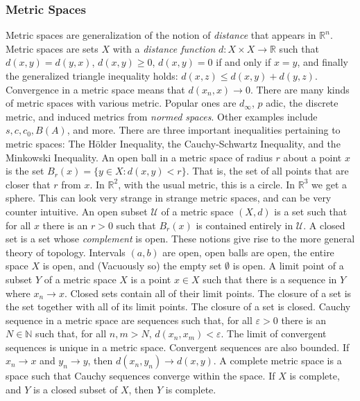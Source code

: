 \documentclass[crop=false,class=article,oneside]{standalone}
\begin{document}
        \subsubsection{Metric Spaces}
            Metric spaces are generalization of the notion
            of \textit{distance} that appears in $\mathbb{R}^{n}$.
            Metric spaces are sets $X$ with a
            \textit{distance function}
            $d:X\times{X}\rightarrow\mathbb{R}$ such that
            $d(x,y)=d(y,x)$, $d(x,y)\geq{0}$,
            $d(x,y)=0$ if and only if $x=y$, and finally the
            generalized triangle inequality holds:
            $d(x,z)\leq{d(x,y)+d(y,z)}$. Convergence in a metric
            space means that $d(x_{n},x)\rightarrow{0}$. There are
            many kinds of metric spaces with various metric. Popular
            ones are $d_{\infty}$, $p$ adic, the discrete metric,
            and induced metrics from \textit{normed spaces}.
            Other examples include $s,c,c_{0},B(A)$, and more.
            There are three important inequalities pertaining to
            metric spaces: The H\"{o}lder Inequality,
            the Cauchy-Schwartz Inequality, and the
            Minkowski Inequality. An open ball in a metric
            space of radius $r$ about a point $x$ is the set
            $B_{r}(x)=\{y\in{X}:d(x,y)<r\}$. That is, the
            set of all points that are closer that $r$ from $x$.
            In $\mathbb{R}^{2}$, with the usual metric, this
            is a circle. In $\mathbb{R}^{3}$ we get a sphere.
            This can look very strange in strange metric spaces,
            and can be very counter intuitive. An open subset
            $\mathcal{U}$ of a metric space $(X,d)$ is a set
            such that for all $x$ there is an $r>0$ such that
            $B_{r}(x)$ is contained entirely in $\mathcal{U}$.
            A closed set is a set whose \textit{complement} is
            open. These notions give rise to the more general
            theory of topology. Intervals $(a,b)$ are open,
            open balls are open, the entire space $X$ is open,
            and (Vacuously so) the empty set $\emptyset$ is open.
            A limit point of a subset $Y$ of a metric space $X$
            is a point $x\in{X}$ such that there is a sequence
            in $Y$ where $x_{n}\rightarrow{x}$. Closed sets
            contain all of their limit points.
            The closure of a set is the set together with all
            of its limit points. The closure of a set is closed.
            Cauchy sequence in a metric space are sequences such
            that, for all $\varepsilon>0$ there is an
            $N\in\mathbb{N}$ such that, for all $n,m>N$,
            $d(x_{n},x_{m})<\varepsilon$. The limit of
            convergent sequences is unique in a metric space.
            Convergent sequences are also bounded. If
            $x_{n}\rightarrow{x}$ and $y_{n}\rightarrow{y}$,
            then $d(x_{n},y_{n})\rightarrow{d(x,y)}$.
            A complete metric space is a space such that
            Cauchy sequences converge within the space.
            If $X$ is complete, and $Y$ is a closed subset of
            $X$, then $Y$ is complete.
\end{document}
